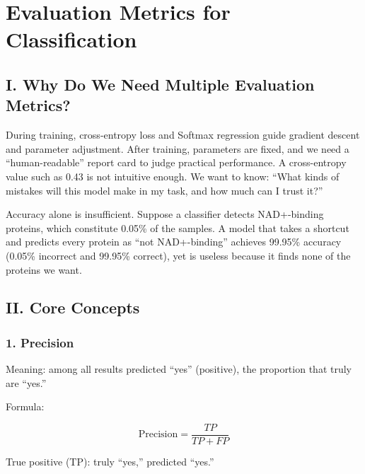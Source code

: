 \setcounter{section}{1}

\hypertarget{evaluation-metrics-for-classification}{%
\section{Evaluation Metrics for Classification}\label{evaluation-metrics-for-classification}}

\hypertarget{i.-why-do-we-need-multiple-evaluation-metrics}{%
\subsection{I. Why Do We Need Multiple Evaluation Metrics?}\label{i.-why-do-we-need-multiple-evaluation-metrics}}

During training, cross-entropy loss and Softmax regression guide gradient descent and parameter adjustment. After training, parameters are fixed, and we need a ``human-readable'' report card to judge practical performance. A cross-entropy value such as 0.43 is not intuitive enough. We want to know: ``What kinds of mistakes will this model make in my task, and how much can I trust it?''

Accuracy alone is insufficient. Suppose a classifier detects NAD+-binding proteins, which constitute 0.05\% of the samples. A model that takes a shortcut and predicts every protein as ``not NAD+-binding'' achieves 99.95\% accuracy (0.05\% incorrect and 99.95\% correct), yet is useless because it finds none of the proteins we want.

\hypertarget{ii.-core-concepts}{%
\subsection{II. Core Concepts}\label{ii.-core-concepts}}

\hypertarget{precision}{%
\subsubsection{1. Precision}\label{precision}}

Meaning: among all results predicted ``yes'' (positive), the proportion that truly are ``yes.''

Formula:

\[
\mathrm{Precision}=\frac{TP}{TP+FP}
\]

True positive (TP): truly ``yes,'' predicted ``yes.''

